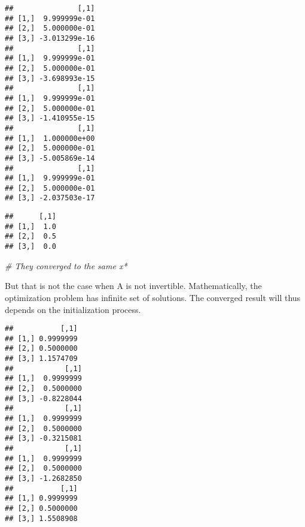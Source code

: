 \documentclass[]{article}
\newenvironment{Shaded}{\begin{snugshade}}{\end{snugshade}}
\newcommand{\KeywordTok}[1]{\textcolor[rgb]{0.13,0.29,0.53}{\textbf{#1}}}
\newcommand{\DecValTok}[1]{\textcolor[rgb]{0.00,0.00,0.81}{#1}}
\newcommand{\StringTok}[1]{\textcolor[rgb]{0.31,0.60,0.02}{#1}}
\newcommand{\CommentTok}[1]{\textcolor[rgb]{0.56,0.35,0.01}{\textit{#1}}}
\newcommand{\OtherTok}[1]{\textcolor[rgb]{0.56,0.35,0.01}{#1}}
\newcommand{\ControlFlowTok}[1]{\textcolor[rgb]{0.13,0.29,0.53}{\textbf{#1}}}
\newcommand{\OperatorTok}[1]{\textcolor[rgb]{0.81,0.36,0.00}{\textbf{#1}}}
\newcommand{\NormalTok}[1]{#1}
\begin{document}
\begin{verbatim}
##               [,1]
## [1,]  9.999999e-01
## [2,]  5.000000e-01
## [3,] -3.013299e-16
##               [,1]
## [1,]  9.999999e-01
## [2,]  5.000000e-01
## [3,] -3.698993e-15
##               [,1]
## [1,]  9.999999e-01
## [2,]  5.000000e-01
## [3,] -1.410955e-15
##               [,1]
## [1,]  1.000000e+00
## [2,]  5.000000e-01
## [3,] -5.005869e-14
##               [,1]
## [1,]  9.999999e-01
## [2,]  5.000000e-01
## [3,] -2.037503e-17
\end{verbatim}

\begin{Shaded}
\end{Shaded}

\begin{verbatim}
##      [,1]
## [1,]  1.0
## [2,]  0.5
## [3,]  0.0
\end{verbatim}

\begin{Shaded}
\begin{Highlighting}[]
\CommentTok{# They converged to the same x*}
\end{Highlighting}
\end{Shaded}

But that is not the case when A is not invertible. Mathematically, the
optimization problem has infinite set of solutions. The converged result
will thus depends on the initialization process.

\begin{Shaded}
\end{Shaded}

\begin{verbatim}
##           [,1]
## [1,] 0.9999999
## [2,] 0.5000000
## [3,] 1.1574709
##            [,1]
## [1,]  0.9999999
## [2,]  0.5000000
## [3,] -0.8228044
##            [,1]
## [1,]  0.9999999
## [2,]  0.5000000
## [3,] -0.3215081
##            [,1]
## [1,]  0.9999999
## [2,]  0.5000000
## [3,] -1.2682850
##           [,1]
## [1,] 0.9999999
## [2,] 0.5000000
## [3,] 1.5508908
\end{verbatim}
\end{document}
